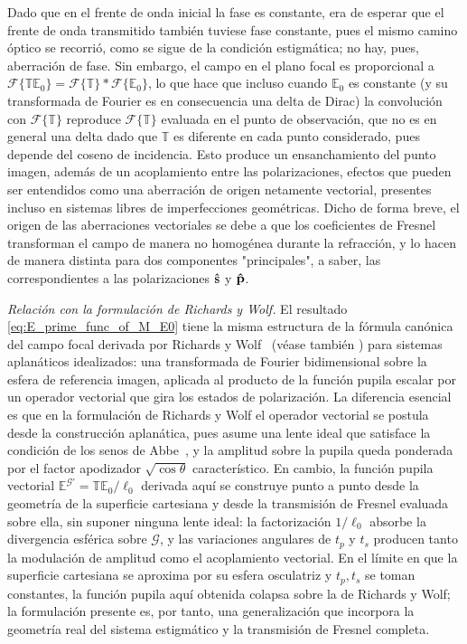 Dado que en el frente de onda inicial la fase es constante, era de esperar que el frente de onda transmitido también tuviese fase constante, pues el mismo camino óptico se recorrió, como se sigue de la condición estigmática; no hay, pues, aberración de fase. Sin embargo, el campo en el plano focal es proporcional a $\mathscr F\{\mathbb T \mathbb E_0\} = \mathscr F\{\mathbb T\} * \mathscr F\{\mathbb E_0\}$, lo que hace que incluso cuando $\mathbb E_0$ es constante (y su transformada de Fourier es en consecuencia una delta de Dirac) la convolución con $\mathscr F\{\mathbb T\}$ reproduce $\mathscr F\{\mathbb T\}$ evaluada en el punto de observación, que no es en general una delta dado que $\mathbb T$ es diferente en cada punto considerado, pues depende del coseno de incidencia. Esto produce un ensanchamiento del punto imagen, además de un acoplamiento entre las polarizaciones, efectos que pueden ser entendidos como una aberración de origen netamente vectorial, presentes incluso en sistemas libres de imperfecciones geométricas. Dicho de forma breve, el origen de las aberraciones vectoriales se debe a que los coeficientes de Fresnel transforman el campo de manera no homogénea durante la refracción, y lo hacen de manera distinta para dos componentes "principales", a saber, las correspondientes a las polarizaciones $\bm{\hat{\mathbf{s}}}$ y $\bm{\hat{\mathbf{p}}}$.

\medskip

\noindent\textit{Relación con la formulación de Richards y Wolf.} El resultado
\eqref{eq:E_prime_func_of_M_E0} tiene la misma estructura de la fórmula
canónica del campo focal derivada por Richards y Wolf~\cite{RichardsWolf1959}
(véase también \cite{Torok1995})
para sistemas aplanáticos idealizados: una transformada de Fourier
bidimensional sobre la esfera de referencia imagen, aplicada al producto de
la función pupila escalar por un operador vectorial que gira los estados de
polarización. La diferencia esencial es que en la formulación de Richards y
Wolf el operador vectorial se postula desde la construcción aplanática, pues
asume una lente ideal que satisface la condición de los senos de Abbe~\cite{Abbe1873}, y
la amplitud sobre la pupila queda ponderada por el factor apodizador
$\sqrt{\cos\theta}$ característico. En cambio, la función pupila vectorial
$\mathbb E^{\mathscr G'}=\mathbb T\mathbb E_0/\ell_0$ derivada aquí se
construye punto a punto desde la geometría de la superficie
cartesiana y desde la transmisión de Fresnel evaluada sobre ella, sin
suponer ninguna lente ideal: la factorización $1/\ell_0$ absorbe la
divergencia esférica sobre $\mathscr G$, y las variaciones angulares de
$t_p$ y $t_s$ producen tanto la modulación de amplitud como el acoplamiento
vectorial. En el límite en que la superficie cartesiana se aproxima por su
esfera osculatriz y $t_p,t_s$ se toman constantes, la función pupila aquí
obtenida colapsa sobre la de Richards y Wolf; la formulación presente es,
por tanto, una generalización que incorpora la geometría real del sistema
estigmático y la transmisión de Fresnel completa.

